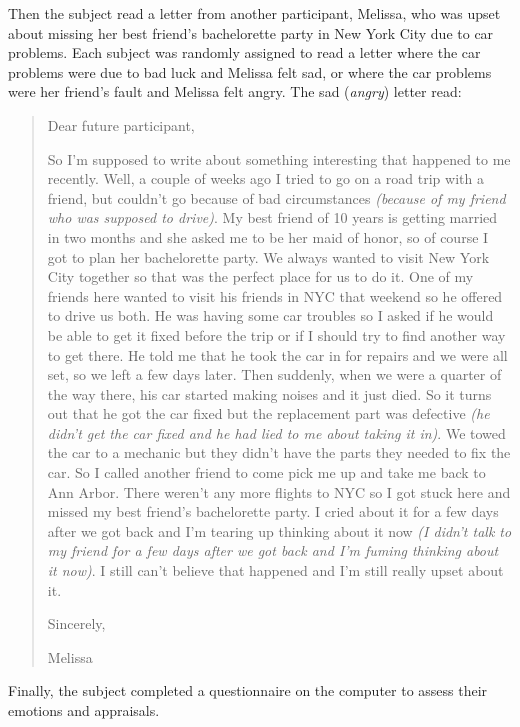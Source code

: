 \documentclass[man,a4paper,noextraspace,apacite]{apa6}\usepackage[]{graphicx}\usepackage[]{color}
\begin{document}
Then the subject read a letter from another participant, Melissa, who was upset about missing her best friend's bachelorette party in New York City due to car problems. Each subject was randomly assigned to read a letter where the car problems were due to bad luck and Melissa felt sad, or where the car problems were her friend's fault and Melissa felt angry. The sad (\textit{angry}) letter read:

\begin{quote}
Dear future participant,

    So I'm supposed to write about something interesting that happened to me recently. Well, a couple of weeks ago I tried to go on a road trip with a friend, but couldn't go because of bad circumstances \textit{(because of my friend who was supposed to drive)}. My best friend of 10 years is getting married in two months and she asked me to be her maid of honor, so of course I got to plan her bachelorette party. We always wanted to visit New York City together so that was the perfect place for us to do it. One of my friends here wanted to visit his friends in NYC that weekend so he offered to drive us both. He was having some car troubles so I asked if he would be able to get it fixed before the trip or if I should try to find another way to get there. He told me that he took the car in for repairs and we were all set, so we left a few days later. Then suddenly, when we were a quarter of the way there, his car started making noises and it just died. So it turns out that he got the car fixed but the replacement part was defective \textit{(he didn't get the car fixed and he had lied to me about taking it in)}. We towed the car to a mechanic but they didn't have the parts they needed to fix the car. So I called another friend to come pick me up and take me back to Ann Arbor. There weren't any more flights to NYC so I got stuck here and missed my best friend's bachelorette party. I cried about it for a few days after we got back and I'm tearing up thinking about it now \textit{(I didn't talk to my friend for a few days after we got back and I'm fuming thinking about it now)}. I still can't believe that happened and I'm still really upset about it.

Sincerely,

Melissa

\end{quote}

Finally, the subject completed a questionnaire on the computer to assess their emotions and appraisals.
\end{document}
